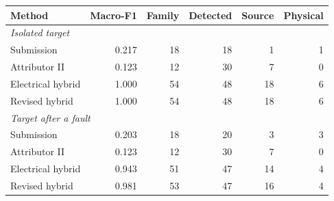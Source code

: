 \begin{tabular}{lrrrrr}\toprule
Method & Macro-F1 & Family & Detected & Source & Physical\\
\midrule
\multicolumn{6}{l}{\emph{Isolated target}}\\
Submission & 0.217 & 18 & 18 & 1 & 1\\
Attributor II & 0.123 & 12 & 30 & 7 & 0\\
Electrical hybrid & 1.000 & 54 & 48 & 18 & 6\\
Revised hybrid & 1.000 & 54 & 48 & 18 & 6\\
\multicolumn{6}{l}{\emph{Target after a fault}}\\
Submission & 0.203 & 18 & 20 & 3 & 3\\
Attributor II & 0.123 & 12 & 30 & 7 & 0\\
Electrical hybrid & 0.943 & 51 & 47 & 14 & 4\\
Revised hybrid & 0.981 & 53 & 47 & 16 & 4\\
\bottomrule\end{tabular}
